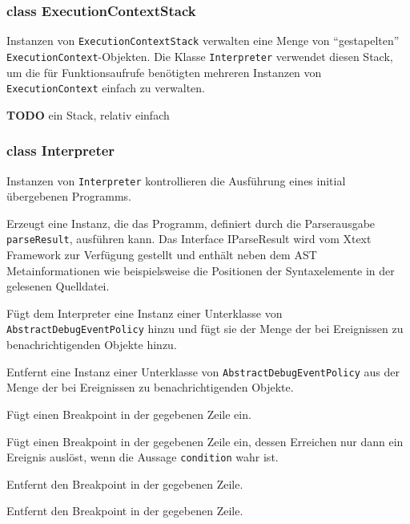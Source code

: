 \subsubsection{class ExecutionContextStack}

Instanzen von \texttt{ExecutionContextStack} verwalten eine Menge von "`gestapelten"' \texttt{ExecutionContext}-Objekten. Die Klasse \texttt{Interpreter} verwendet diesen Stack, um die für Funktionsaufrufe benötigten mehreren Instanzen von \texttt{ExecutionContext} einfach zu verwalten.

\textbf{TODO} ein Stack, relativ einfach

\subsubsection{class Interpreter}

Instanzen von \texttt{Interpreter} kontrollieren die Ausführung eines initial übergebenen Programms.

\begin{description}
    Erzeugt eine Instanz, die das Programm, definiert durch die Parserausgabe \texttt{parseResult}, ausführen kann. Das Interface IParseResult wird vom Xtext Framework zur Verfügung gestellt und enthält neben dem AST Metainformationen wie beispielsweise die Positionen der Syntaxelemente in der gelesenen Quelldatei.

    Fügt dem Interpreter eine Instanz einer Unterklasse von \texttt{AbstractDebugEventPolicy} hinzu und fügt sie der Menge der bei Ereignissen zu benachrichtigenden Objekte hinzu.

    Entfernt eine Instanz einer Unterklasse von \texttt{AbstractDebugEventPolicy} aus der Menge der bei Ereignissen zu benachrichtigenden Objekte.

    Fügt einen Breakpoint in der gegebenen Zeile ein.

    Fügt einen Breakpoint in der gegebenen Zeile ein, dessen Erreichen nur dann ein Ereignis auslöst, wenn die Aussage \texttt{condition} wahr ist.

    Entfernt den Breakpoint in der gegebenen Zeile.

    Entfernt den Breakpoint in der gegebenen Zeile.

\end{description}



